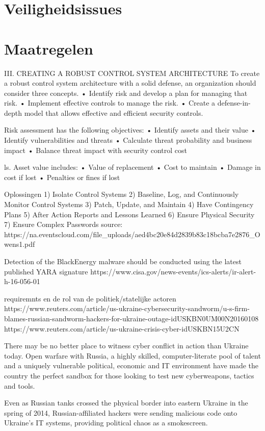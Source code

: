 \documentclass[11pt]{report}
\begin{document}
\section{Veiligheidsissues}

\section{Maatregelen}


III. CREATING A ROBUST CONTROL SYSTEM ARCHITECTURE
To create a robust control system architecture with a solid
defense, an organization should consider three concepts.
• Identify risk and develop a plan for managing that
risk.
• Implement effective controls to manage the risk.
• Create a defense-in-depth model that allows effective
and efficient security controls. 

Risk assessment has the
following objectives:
• Identify assets and their value
• Identify vulnerabilities and threats
• Calculate threat probability and business impact
• Balance threat impact with security control cost

ls. Asset value includes:
• Value of replacement
• Cost to maintain
• Damage in cost if lost
• Penalties or fines if lost

Oplossingen
1) Isolate Control Systems
2) Baseline, Log, and Continuously Monitor Control Systems
3) Patch, Update, and Maintain
4) Have Contingency Plans
5) After Action Reports and Lessons Learned
6) Ensure Physical Security
7) Ensure Complex Passwords
source: https://na.eventscloud.com/file_uploads/aed4bc20e84d2839b83c18bcba7e2876_Owens1.pdf

Detection of the BlackEnergy malware should be conducted using the latest published YARA signature
https://www.cisa.gov/news-events/ics-alerts/ir-alert-h-16-056-01

requiremnts en de rol van de politiek/statelijke actoren
https://www.reuters.com/article/us-ukraine-cybersecurity-sandworm/u-s-firm-blames-russian-sandworm-hackers-for-ukraine-outage-idUSKBN0UM00N20160108
https://www.reuters.com/article/us-ukraine-crisis-cyber-idUSKBN15U2CN

There may be no better place to witness cyber conflict in action than Ukraine today. Open warfare with Russia, a highly skilled, computer-literate pool of talent and a uniquely vulnerable political, economic and IT environment have made the country the perfect sandbox for those looking to test new cyberweapons, tactics and tools.

Even as Russian tanks crossed the physical border into eastern Ukraine in the spring of 2014, Russian-affiliated hackers were sending malicious code onto Ukraine’s IT systems, providing political chaos as a smokescreen.
\end{document}
